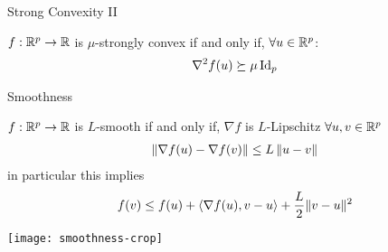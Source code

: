 \begin{frame}{Strong Convexity II}
    \begin{proposition}
        $f: \mathbb{R}^p \rightarrow \mathbb{R}$ is $\mu$-strongly convex if and only if, $ \forall u \in \mathbb{R}^p$:
        \begin{align*}
            \nabla^2 f(u) \succeq \mu \operatorname{Id}_p
        \end{align*}
    \end{proposition}

\end{frame}

\begin{frame}{Smoothness}
    \begin{definition}[Smoothness]
        $f: \mathbb{R}^p \rightarrow \mathbb{R}$ is $L$-smooth if and only if, $\nabla f$ is $L$-Lipschitz
        $ \forall u, v \in \mathbb{R}^p$
        \begin{align*}
            \left\lVert {\nabla f (u) - \nabla f (v)} \right\rVert
            \leq 
            L \left\lVert {u - v} \right\rVert
        \end{align*}
        in particular this implies
        \begin{align*}
            f(v)
            \leq 
            f(u)
            + \langle \nabla f (u) , v - u \rangle
            + \frac{L}{2} \lVert {v - u} \rVert^2
        \end{align*}
    \end{definition}
    \centering
    \texttt{[image: smoothness-crop]}
\end{frame}
